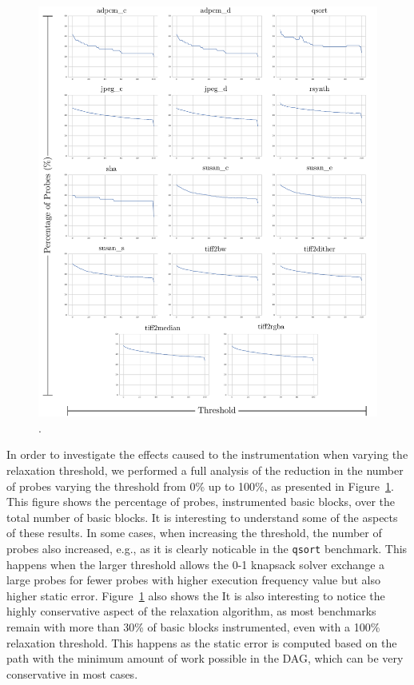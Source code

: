 \begin{figure}[h!]
    \centering
    \includegraphics[width=\textwidth]{figs/instr-all-thresholds.pdf}
    \caption{.}
    \label{fig:instr-all-thresholds}
\end{figure}

In order to investigate the effects caused to the instrumentation when varying the relaxation threshold, we performed a full analysis of the reduction in the number of probes varying the threshold from 0\% up to 100\%, as presented in Figure~\ref{fig:instr-all-thresholds}.
This figure shows the percentage of probes, instrumented basic blocks, over the total number of basic blocks.
It is interesting to understand some of the aspects of these results.
In some cases, when increasing the threshold, the number of probes also increased, e.g., as it is clearly noticable in the \texttt{qsort} benchmark.
This happens when the larger threshold allows the 0-1 knapsack solver exchange a large probes for fewer probes with higher execution frequency value but also higher static error.
Figure~\ref{fig:instr-all-thresholds} also shows the 
It is also interesting to notice the highly conservative aspect of the relaxation algorithm, as most benchmarks remain with more than 30\% of basic blocks instrumented, even with a 100\% relaxation threshold.
This happens as the static error is computed based on the path with the minimum amount of work possible in the DAG, which can be very conservative in most cases.


